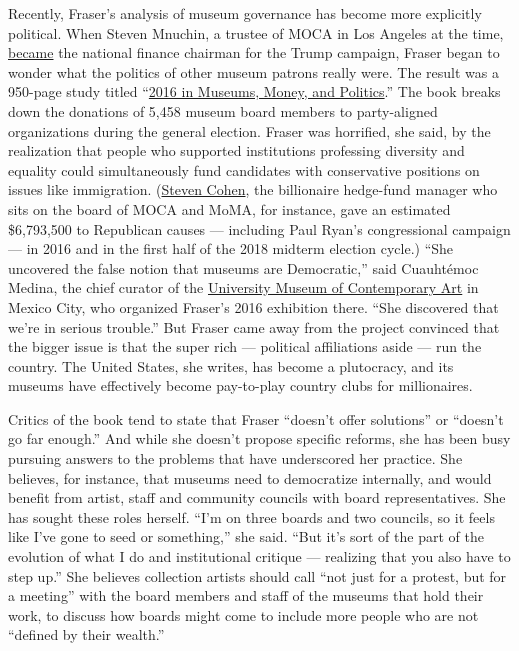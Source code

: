 Recently, Fraser's analysis of museum governance has become more
explicitly political. When Steven Mnuchin, a trustee of MOCA in Los
Angeles at the time,
\href{https://www.nytimes3xbfgragh.onion/2016/05/10/business/dealbook/donald-trumps-pick-for-fund-raiser-is-rife-with-contradictions.html}{became}
the national finance chairman for the Trump campaign, Fraser began to
wonder what the politics of other museum patrons really were. The result
was a 950-page study titled
``\href{https://mitpress.mit.edu/books/2016}{2016 in Museums, Money, and
Politics}.'' The book breaks down the donations of 5,458 museum board
members to party-aligned organizations during the general election.
Fraser was horrified, she said, by the realization that people who
supported institutions professing diversity and equality could
simultaneously fund candidates with conservative positions on issues
like immigration.
(\href{https://www.nytimes3xbfgragh.onion/topic/person/steven-cohen}{Steven
Cohen}, the billionaire hedge-fund manager who sits on the board of MOCA
and MoMA, for instance, gave an estimated \$6,793,500 to Republican
causes --- including Paul Ryan's congressional campaign --- in 2016 and
in the first half of the 2018 midterm election cycle.) ``She uncovered
the false notion that museums are Democratic,'' said Cuauhtémoc Medina,
the chief curator of the
\href{https://muac.unam.mx/acerca-de-nosotros?lang=en}{University Museum
of Contemporary Art} in Mexico City, who organized Fraser's 2016
exhibition there. ``She discovered that we're in serious trouble.'' But
Fraser came away from the project convinced that the bigger issue is
that the super rich --- political affiliations aside --- run the
country. The United States, she writes, has become a plutocracy, and its
museums have effectively become pay-to-play country clubs for
millionaires.

Critics of the book tend to state that Fraser ``doesn't offer
solutions'' or ``doesn't go far enough.'' And while she doesn't propose
specific reforms, she has been busy pursuing answers to the problems
that have underscored her practice. She believes, for instance, that
museums need to democratize internally, and would benefit from artist,
staff and community councils with board representatives. She has sought
these roles herself. ``I'm on three boards and two councils, so it feels
like I've gone to seed or something,'' she said. ``But it's sort of the
part of the evolution of what I do and institutional critique ---
realizing that you also have to step up.'' She believes collection
artists should call ``not just for a protest, but for a meeting'' with
the board members and staff of the museums that hold their work, to
discuss how boards might come to include more people who are not
``defined by their wealth.''

